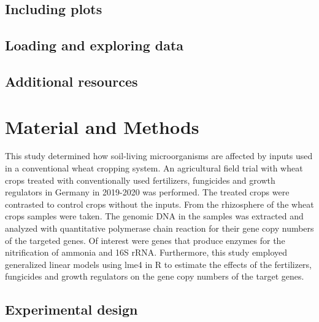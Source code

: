 \documentclass[twoside,12pt,final]{ucthesis-CA2012}
\begin{document}
\begin{ucmainmatter}
\hypertarget{including-plots}{%
\section{Including plots}\label{including-plots}}

\hypertarget{loading-and-exploring-data}{%
\section{Loading and exploring data}\label{loading-and-exploring-data}}

\hypertarget{additional-resources}{%
\section{Additional resources}\label{additional-resources}}

\hypertarget{material-and-methods}{%
\chapter*{Material and Methods}\label{material-and-methods}}


This study determined how soil-living microorganisms are affected by inputs used in a conventional wheat cropping system. An agricultural field trial with wheat crops treated with conventionally used fertilizers, fungicides and growth regulators in Germany in 2019-2020 was performed. The treated crops were contrasted to control crops without the inputs. From the rhizosphere of the wheat crops samples were taken. The genomic DNA in the samples was extracted and analyzed with quantitative polymerase chain reaction for their gene copy numbers of the targeted genes. Of interest were genes that produce enzymes for the nitrification of ammonia and 16S rRNA. Furthermore, this study employed generalized linear models using lme4 in R to estimate the effects of the fertilizers, fungicides and growth regulators on the gene copy numbers of the target genes.

\hypertarget{experimental-design}{%
\section{Experimental design}\label{experimental-design}}

\hypertarget{field-trial-of-winter-wheat-in-a-randomized-complete-block-design}{%
}
\end{ucmainmatter}
\end{document}
